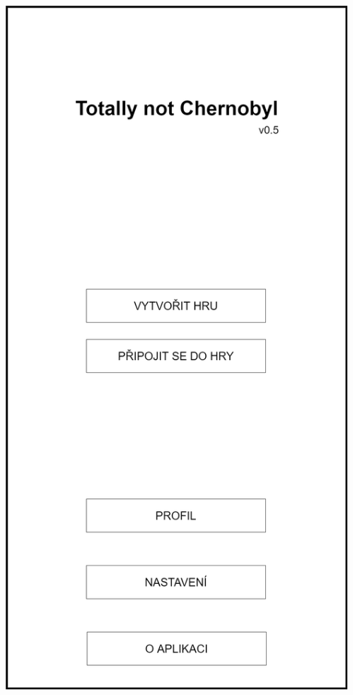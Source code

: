 \documentclass[czech,aspectratio=169]{beamer}
\begin{document}
\begin{frame}
\begin{columns}
\begin{column}{.25\textwidth}
        \begin{center}
          \includegraphics[width=.9\textwidth]{assets/slides/screen-1}
        \end{center}
      \end{column}
      \begin{column}{.25\textwidth}
        \begin{center}

\end{center}
\end{column}
\end{columns}
\end{frame}
\end{document}
